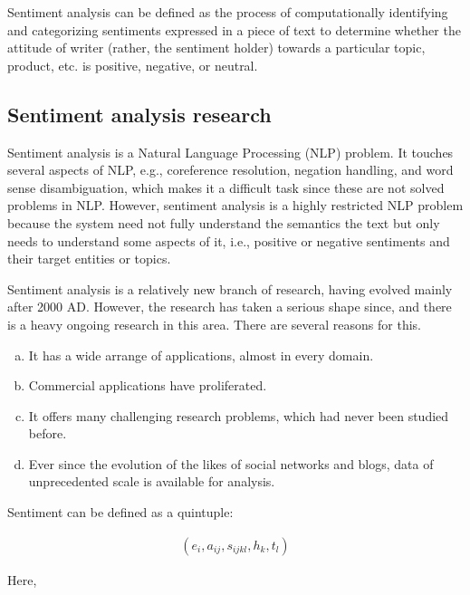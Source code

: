 Sentiment analysis can be defined as the process of computationally identifying and categorizing sentiments expressed in a piece of text 
to determine whether the attitude of writer (rather, the sentiment holder) towards a particular topic, product, etc. is positive, negative, or neutral.

\subsection{Sentiment analysis research}

Sentiment analysis is a Natural Language Processing (NLP) problem. It touches several aspects of NLP, e.g., coreference resolution, negation handling, and
word sense disambiguation, which makes it a difficult task since these are not solved problems in NLP. However, sentiment analysis is a highly restricted NLP problem 
because the system need not fully understand the semantics the text but
only needs to understand some aspects of it, i.e., positive or negative sentiments and their target entities or topics. \vspace{8mm} 

Sentiment analysis is a relatively new branch of research, having evolved mainly after 2000 AD. However, the research has taken a serious shape since, and 
there is a heavy ongoing research in this area. There are several reasons for this.

\begin{enumerate}[(a)]%
\item It has a wide arrange of applications, almost in every domain.
\item Commercial applications have proliferated.
\item It offers many challenging research problems, which had never been studied before.
\item Ever since the evolution of the likes of social networks and blogs, data of unprecedented scale is available for analysis.
\end{enumerate}  

Sentiment can be defined as a quintuple:

\begin{framed}
\begin{eqnarray}
 ( e_i , a_{ij} , s_{ijkl} , h_k , t_l ) \nonumber
\end{eqnarray}
\end{framed}

Here,

